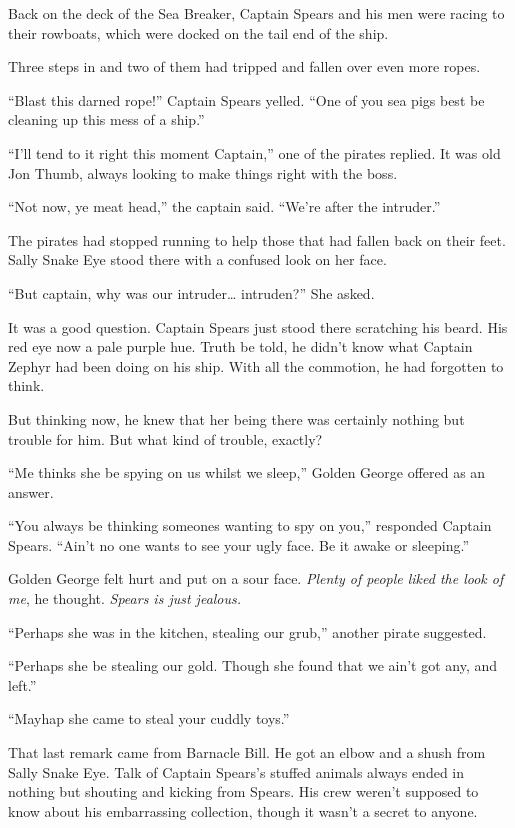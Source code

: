 \documentclass[12pt]{extbook}
\begin{document}
  Back on the deck of the Sea Breaker, Captain Spears and his men were
  racing to their rowboats, which were docked on the tail end of the ship.
  
  Three steps in and two of them had tripped and fallen over even more
  ropes.
  
  \enquote{Blast this darned rope!} Captain Spears yelled. \enquote{One of
  you sea pigs best be cleaning up this mess of a ship.}
  
  \enquote{I'll tend to it right this moment Captain,} one of the pirates
  replied. It was old Jon Thumb, always looking to make things right with
  the boss.
  
  \enquote{Not now, ye meat head,} the captain said. \enquote{We're after
  the intruder.}
  
  The pirates had stopped running to help those that had fallen back on
  their feet. Sally Snake Eye stood there with a confused look on her
  face.
  
  \enquote{But captain, why was our intruder\ldots{} intruden?} She asked.
  
  It was a good question. Captain Spears just stood there scratching his
  beard. His red eye now a pale purple hue. Truth be told, he didn't know
  what Captain Zephyr had been doing on his ship. With all the commotion,
  he had forgotten to think.
  
  But thinking now, he knew that her being there was certainly nothing but
  trouble for him. But what kind of trouble, exactly?
  
  \enquote{Me thinks she be spying on us whilst we sleep,} Golden George
  offered as an answer.
  
  \enquote{You always be thinking someones wanting to spy on you,}
  responded Captain Spears. \enquote{Ain't no one wants to see your ugly
  face. Be it awake or sleeping.}
  
  Golden George felt hurt and put on a sour face. \emph{Plenty of people
  liked the look of me}, he thought. \emph{Spears is just jealous.}
  
  \enquote{Perhaps she was in the kitchen, stealing our grub,} another
  pirate suggested.
  
  \enquote{Perhaps she be stealing our gold. Though she found that we
  ain't got any, and left.}
  
  \enquote{Mayhap she came to steal your cuddly toys.}
  
  That last remark came from Barnacle Bill. He got an elbow and a shush
  from Sally Snake Eye. Talk of Captain Spears's stuffed animals always
  ended in nothing but shouting and kicking from Spears. His crew weren't
  supposed to know about his embarrassing collection, though it wasn't a
  secret to anyone.
  
\end{document}
